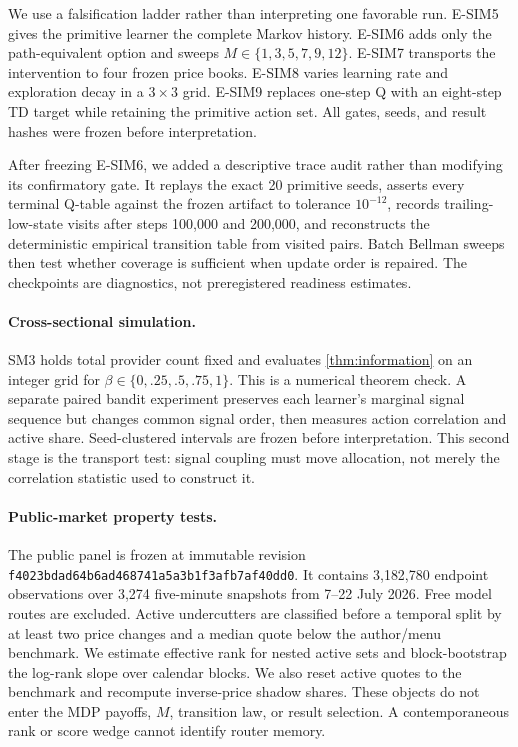 \documentclass[10pt,twocolumn]{article}
\begin{document}
We use a falsification ladder rather than interpreting one favorable run.
E-SIM5 gives the primitive learner the complete Markov history.  E-SIM6 adds
only the path-equivalent option and sweeps
$M\in\{1,3,5,7,9,12\}$.  E-SIM7 transports the intervention to four frozen
price books.  E-SIM8 varies learning rate and exploration decay in a $3\times3$
 grid.  E-SIM9 replaces one-step Q with an eight-step TD target while retaining
 the primitive action set.  All gates, seeds, and result hashes were frozen
 before interpretation.

After freezing E-SIM6, we added a descriptive trace audit rather than modifying
its confirmatory gate.  It replays the exact 20 primitive seeds, asserts every
terminal Q-table against the frozen artifact to tolerance $10^{-12}$, records
trailing-low-state visits after steps 100,000 and 200,000, and reconstructs the
deterministic empirical transition table from visited pairs.  Batch Bellman
sweeps then test whether coverage is sufficient when update order is repaired.
The checkpoints are diagnostics, not preregistered readiness estimates.

\paragraph{Cross-sectional simulation.}
SM3 holds total provider count fixed and evaluates
\cref{thm:information} on an integer grid for
$\beta\in\{0,.25,.5,.75,1\}$.  This is a numerical theorem check.  A separate
paired bandit experiment preserves each learner's marginal signal sequence but
changes common signal order, then measures action correlation and active share.
Seed-clustered intervals are frozen before interpretation.  This second stage
is the transport test: signal coupling must move allocation, not merely the
correlation statistic used to construct it.

\paragraph{Public-market property tests.}
The public panel is frozen at immutable revision
\texttt{f4023bdad64b6ad468741a5a3b1f3afb7af40dd0}.  It contains 3,182,780
endpoint observations over 3,274 five-minute snapshots from 7--22 July 2026.
Free model routes are excluded.  Active undercutters are classified before a
temporal split by at least two price changes and a median quote below the
author/menu benchmark.  We estimate effective rank for nested active sets and
block-bootstrap the log-rank slope over calendar blocks.  We also reset active
quotes to the benchmark and recompute inverse-price shadow shares.  These
objects do not enter the MDP payoffs, $M$, transition law, or result selection.
A contemporaneous rank or score wedge cannot identify router memory.
\end{document}
